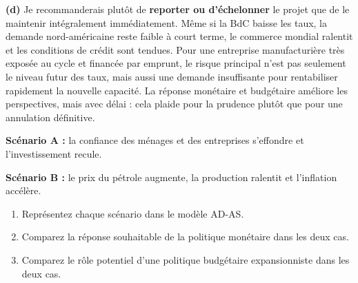 \begin{reponse}
\textbf{(d)} Je recommanderais plutôt de \textbf{reporter ou d'échelonner} le projet que de le maintenir intégralement immédiatement. Même si la BdC baisse les taux, la demande nord-américaine reste faible à court terme, le commerce mondial ralentit et les conditions de crédit sont tendues. Pour une entreprise manufacturière très exposée au cycle et financée par emprunt, le risque principal n'est pas seulement le niveau futur des taux, mais aussi une demande insuffisante pour rentabiliser rapidement la nouvelle capacité. La réponse monétaire et budgétaire améliore les perspectives, mais avec délai : cela plaide pour la prudence plutôt que pour une annulation définitive.
\end{reponse}


\textbf{Scénario A :} la confiance des ménages et des entreprises s'effondre et l'investissement recule.

\textbf{Scénario B :} le prix du pétrole augmente, la production ralentit et l'inflation accélère.

\begin{enumerate}[label=(\alph*)]
   \item Représentez chaque scénario dans le modèle AD-AS.
   \item Comparez la réponse souhaitable de la politique monétaire dans les deux cas.
   \item Comparez le rôle potentiel d'une politique budgétaire expansionniste dans les deux cas.
\end{enumerate}

